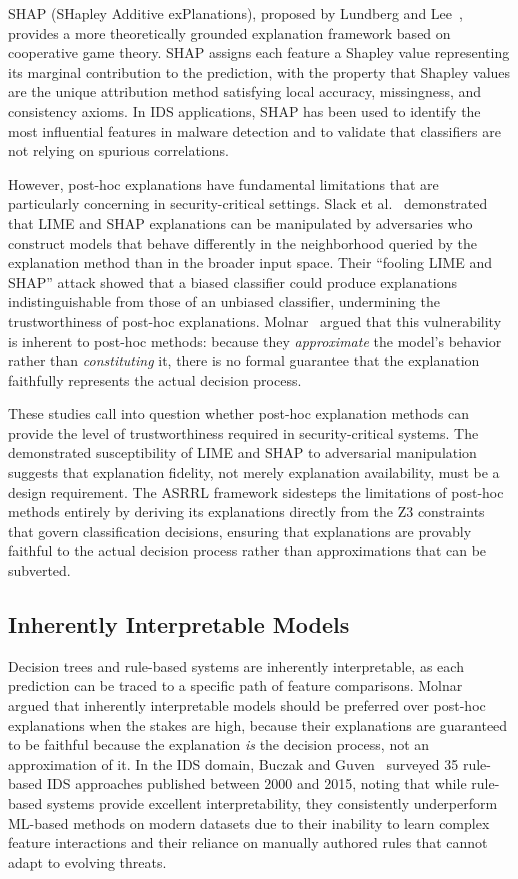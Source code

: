 \documentclass[12pt, letterpaper, oneside]{report}
\newcommand{\ASRRL}{\textsc{ASRRL}}
\begin{document}
SHAP (SHapley Additive exPlanations), proposed by Lundberg and Lee~\cite{lundberg2017}, provides a more theoretically grounded explanation framework based on cooperative game theory. SHAP assigns each feature a Shapley value representing its marginal contribution to the prediction, with the property that Shapley values are the unique attribution method satisfying local accuracy, missingness, and consistency axioms. In IDS applications, SHAP has been used to identify the most influential features in malware detection and to validate that classifiers are not relying on spurious correlations.

However, post-hoc explanations have fundamental limitations that are particularly concerning in security-critical settings. Slack et al.~\cite{slack2020} demonstrated that LIME and SHAP explanations can be manipulated by adversaries who construct models that behave differently in the neighborhood queried by the explanation method than in the broader input space. Their ``fooling LIME and SHAP'' attack showed that a biased classifier could produce explanations indistinguishable from those of an unbiased classifier, undermining the trustworthiness of post-hoc explanations. Molnar~\cite{molnar2020} argued that this vulnerability is inherent to post-hoc methods: because they \emph{approximate} the model's behavior rather than \emph{constituting} it, there is no formal guarantee that the explanation faithfully represents the actual decision process.

These studies call into question whether post-hoc explanation methods can provide the level of trustworthiness required in security-critical systems. The demonstrated susceptibility of LIME and SHAP to adversarial manipulation suggests that explanation fidelity, not merely explanation availability, must be a design requirement. The \ASRRL{} framework sidesteps the limitations of post-hoc methods entirely by deriving its explanations directly from the Z3 constraints that govern classification decisions, ensuring that explanations are provably faithful to the actual decision process rather than approximations that can be subverted.

\subsection{Inherently Interpretable Models}

Decision trees and rule-based systems are inherently interpretable, as each prediction can be traced to a specific path of feature comparisons. Molnar~\cite{molnar2020} argued that inherently interpretable models should be preferred over post-hoc explanations when the stakes are high, because their explanations are guaranteed to be faithful because the explanation \emph{is} the decision process, not an approximation of it. In the IDS domain, Buczak and Guven~\cite{buczak2016} surveyed 35 rule-based IDS approaches published between 2000 and 2015, noting that while rule-based systems provide excellent interpretability, they consistently underperform ML-based methods on modern datasets due to their inability to learn complex feature interactions and their reliance on manually authored rules that cannot adapt to evolving threats.
\end{document}
